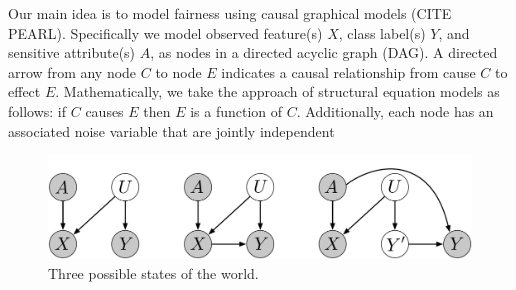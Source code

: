 Our main idea is to model fairness using causal graphical models (CITE PEARL). Specifically we model observed feature(s) $X$, class label(s) $Y$, and sensitive attribute(s) $A$, as nodes in a directed acyclic graph (DAG). A directed arrow from any node $C$ to node $E$ indicates a causal relationship from cause $C$ to effect $E$. Mathematically, we take the approach of structural equation models as follows: if $C$ causes $E$ then $E$ is a function of $C$. Additionally, each node has an associated noise variable that are jointly independent
















\begin{figure}[th!]
\begin{center}
\vspace{-2ex}
\centerline{\includegraphics[width=\textwidth]{simple_models_no_q}}
\vspace{-2ex}
\caption{Three possible states of the world.\label{figure.simple_models}}
\vspace{-2ex}
\end{center}
\end{figure}